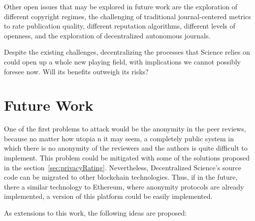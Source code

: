 Other open issues that may be explored in future work are the exploration of
different copyright regimes, the challenging of traditional journal-centered
metrics to rate publication quality, different reputation algorithms, different
levels of openness, and the exploration of decentralized autonomous journals.

Despite the existing challenges, decentralizing the processes that Science
relies on could open up a whole new playing field, with implications we cannot
possibly foresee now. Will its benefits outweigh its risks?

\section{Future Work}

One of the first problems to attack would be the anonymity in the peer reviews,
because no matter how utopia
n it may seem, a completely public system in which
there is no anonymity of the reviewers and the authors is quite difficult to
implement. This problem could be mitigated with some of the solutions proposed
in the section~\ref{sec:privacyRating}. Nevertheless, Decentralized Science's
source code can be migrated to other blockchain technologies. Thus, if in the
future, there a similar technology to Ethereum, where anonymity protocols are
already implemented, a version of this platform could be easily implemented.

As extensions to this work, the following ideas are proposed:


